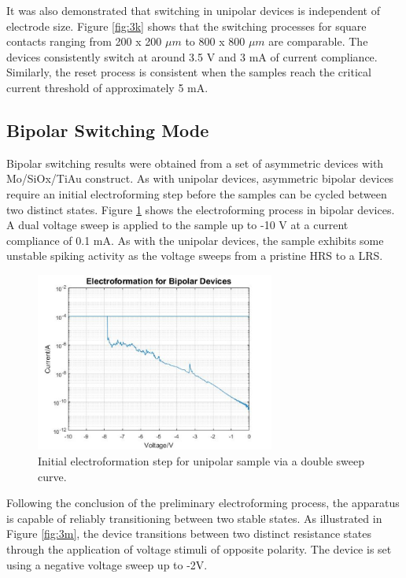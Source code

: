 \noindent It was also demonstrated that switching in unipolar devices is independent of electrode size. Figure \ref{fig:3k} shows that the switching processes for square contacts ranging from 200 x 200 $\mu m$ to 800 x 800 $\mu m$ are comparable. The devices consistently switch at around 3.5 V and 3 mA of current compliance. Similarly, the reset process is consistent when the samples reach the critical current threshold of approximately 5 mA.

\subsection[Bipolar Switching Mode]{Bipolar Switching Mode}

\noindent  Bipolar switching results were obtained from a set of asymmetric devices with Mo/SiOx/TiAu construct. As with unipolar devices, asymmetric bipolar devices require an initial electroforming step before the samples can be cycled between two distinct states. Figure \ref{fig:3l} shows the electroforming process in bipolar devices. A dual voltage sweep is applied to the sample up to -10 V at a current compliance of 0.1 mA. As with the unipolar devices, the sample exhibits some unstable spiking activity as the voltage sweeps from a pristine HRS to a LRS.\\


\begin{figure}[htbp!] 
    \centering    
    \includegraphics[width=0.7\textwidth]{Chapter3/Figs/l.png}
    \caption[Initial electroformation step for unipolar sample via a double sweep curve.]{Initial electroformation step for unipolar sample via a double sweep curve.}
    \label{fig:3l}
\end{figure}


\noindent Following the conclusion of the preliminary electroforming process, the apparatus is capable of reliably transitioning between two stable states. As illustrated in Figure \ref{fig:3m}, the device transitions between two distinct resistance states through the application of voltage stimuli of opposite polarity. The device is set using a negative voltage sweep up to -2V. \\

